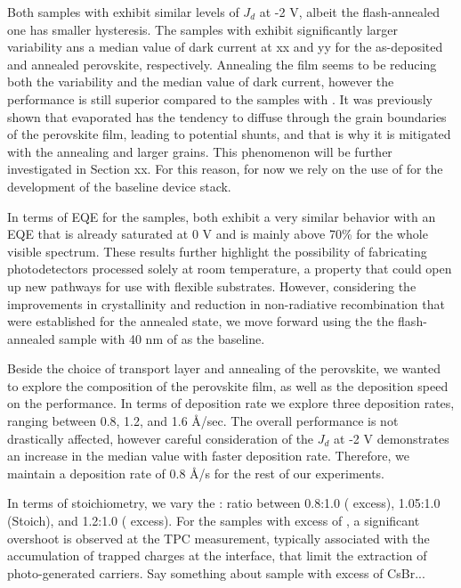 Both samples with  exhibit similar levels of $J_d$ at -2 V, albeit the flash-annealed one has smaller hysteresis. The samples with  exhibit significantly larger variability ans a median value of dark current at xx and yy for the as-deposited and annealed perovskite, respectively. Annealing the film seems to be reducing both the variability and the median value of dark current, however the performance is still superior compared to the samples with . It was previously shown that evaporated  has the tendency to diffuse through the grain boundaries of the perovskite film, leading to potential shunts, and that is why it is mitigated with the annealing and larger grains. This phenomenon will be further investigated in Section xx. For this reason, for now we rely on the use of  for the development of the baseline device stack. 

In terms of EQE for the  samples, both exhibit a very similar behavior with an EQE that is already saturated at 0 V and is mainly above 70\% for the whole visible spectrum. These results further highlight the possibility of fabricating photodetectors processed solely at room temperature, a property that could open up new pathways for use with flexible substrates. However, considering the improvements in crystallinity and reduction in non-radiative recombination that were established for the annealed state, we move forward using the the flash-annealed sample with 40 nm of  as the baseline. 



Beside the choice of transport layer and annealing of the perovskite, we wanted to explore the composition of the perovskite film, as well as the deposition speed on the performance. In terms of deposition rate we explore three deposition rates, ranging between 0.8, 1.2, and 1.6 {\AA}/sec. The overall performance is not drastically affected, however careful consideration of the $J_d$ at -2 V demonstrates an increase in the median value with faster deposition rate. Therefore, we maintain a deposition rate of 0.8 {\AA}/s for the rest of our experiments. 

In terms of stoichiometry, we vary the : ratio between 0.8:1.0 ( excess), 1.05:1.0 (Stoich), and 1.2:1.0 ( excess). For the samples with excess of , a significant overshoot is observed at the TPC measurement, typically associated with the accumulation of trapped charges at the interface, that limit the extraction of photo-generated carriers. Say something about sample with excess of CsBr...


